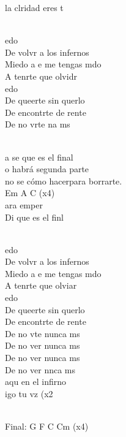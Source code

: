 \begin{cancion}[Miedo][M Clan]
	la clridad eres t         \\\jump\\
	\begin{chorus}%
	edo\\
	De volvr a los infernos\\
	Miedo a e me tengas mdo\\
	A tenrte que olvidr      \\
	edo\\
	De queerte sin querlo\\
	De encontrte de rente\\
	De no vrte na ms\\
	\end{chorus}%
	\jump\\
	a se que es el final\\
	o habrá segunda parte\\
	 no se cómo hacerpara borrarte.\\
Em  A  C (x4)\\
\jump
	ara emper\\
	Di que es el finl \\\jump\\
	\begin{chorus}%
	edo\\
	De volvr a los infernos\\
	Miedo a e me tengas mdo\\
	A tenrte que olviar     \\
	edo\\
	De queerte sin querlo\\
	De encontrte de rente\\
	De no vte nunca ms         \\
	De no ver nunca ms         \\
	De no ver nunca ms         \\
	De no ver nnca ms             \\
\jump
	 aqu en el infirno  \\
	  igo tu vz (x2\\
	\end{chorus}%
	\jump\\
Final:  G  F  C  Cm (x4)\\
\end{cancion}%
